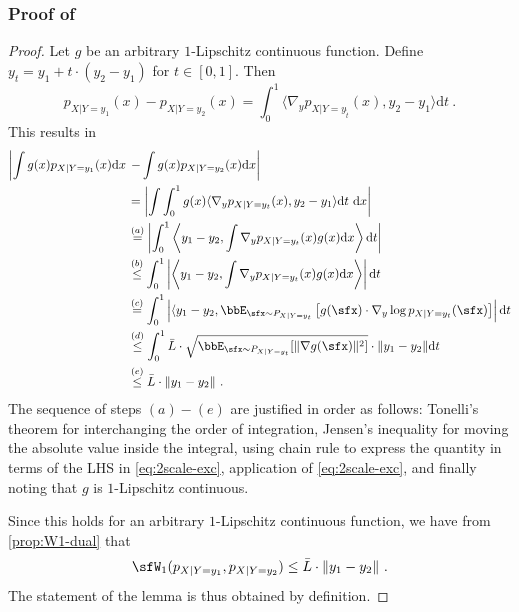 \documentclass[11pt]{article}
\newcounter{ct}
\newcommand{\rmd}{\mathrm{d}}
\begin{document}
\subsubsection{Proof of }
\label{sec:prf:ricci-curvature}
\begin{proof}
Let \(g\) be an arbitrary \(1\)-Lipschitz continuous function.
Define \(y_{t} = y_{1} + t \cdot (y_{2} - y_{1})\) for \(t \in [0, 1]\).
Then
\begin{equation}
\label{eq:mvt-cond}
    p_{X | Y = y_{1}}(x) - p_{X | Y = y_{2}}(x) = \int_{0}^{1} \langle \nabla_{y} p_{X | Y = y_{\tilde{t}}}(x), y_{2} - y_{1}\rangle \rmd t~.
\end{equation}
This results in
\begin{align*}
    \left|\int g(x) p_{X | Y = y_{1}}(x) \rmd x \right.&\left.- \int g(x) p_{X | Y = y_{2}}(x) \rmd x\right| \\
    &= \left|\int \int_{0}^{1} g(x) \langle \nabla_{y} p_{X | Y = y_{t}}(x), y_{2} - y_{1}\rangle \rmd t ~\rmd x\right|\\
    &\overset{(a)}= \left|\int_{0}^{1} \left\langle y_{1} - y_{2}, \int \nabla_{y} p_{X | Y = y_{t}}(x) g(x)\rmd x \right\rangle \rmd t\right| \\
    &\overset{(b)}\leq \int_{0}^{1}\left| \left\langle y_{1} - y_{2}, \int \nabla_{y} p_{X | Y = y_{t}}(x) g(x)\rmd x \right\rangle \right| \rmd t \\
    &\overset{(c)}= \int_{0}^{1} \left| \langle y_{1} - y_{2}, \bbE_{\sfx \sim P_{X | Y = y_{t}}}\left[g(\sfx) \cdot \nabla_{y} \log p_{X | Y = y_{t}}(\sfx)\right]\right| \rmd t \\
    &\overset{(d)}\leq \int_{0}^{1} \bar{L} \cdot \sqrt{\bbE_{\sfx \sim P_{X | Y = y_{t}}}[\|\nabla g(\sfx)\|^{2}]} \cdot \|y_{1} - y_{2}\| \rmd t \\
    &\overset{(e)}\leq \bar{L} \cdot \|y_{1} - y_{2}\|~.
\end{align*}
The sequence of steps \((a)-(e)\) are justified in order as follows: Tonelli's theorem for interchanging the order of integration, Jensen's inequality for moving the absolute value inside the integral, using chain rule to express the quantity in terms of the LHS in \ref{eq:2scale-exc}, application of \ref{eq:2scale-exc}, and finally noting that \(g\) is \(1\)-Lipschitz continuous.

Since this holds for an arbitrary \(1\)-Lipschitz continuous function, we have from \cref{prop:W1-dual} that 
\begin{equation*}
    \sfW_{1}(p_{X | Y = y_{1}}, p_{X | Y = y_{2}}) \leq \bar{L} \cdot \|y_{1} - y_{2}\|~.
\end{equation*}
The statement of the lemma is thus obtained by definition.
\end{proof}
\end{document}
